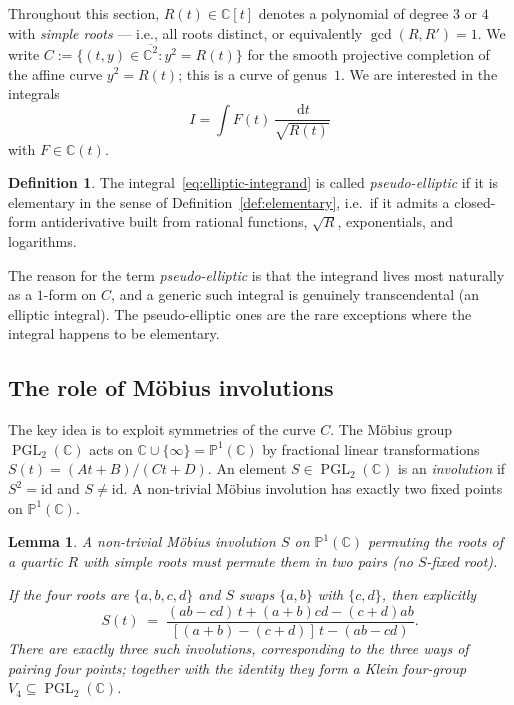 \documentclass[11pt,a4paper]{article}
\theoremstyle{plain}
\newtheorem{lemma}[theorem]{Lemma}
\theoremstyle{definition}
\newtheorem{definition}[theorem]{Definition}
\theoremstyle{remark}
\newcommand{\C}{\mathbb{C}}
\newcommand{\PGL}{\operatorname{PGL}}
\renewcommand{\d}{\,\mathrm{d}}
\begin{document}
Throughout this section, $R(t)\in\C[t]$ denotes a polynomial of degree $3$ or $4$ with \emph{simple roots} — i.e., all roots distinct, or equivalently $\gcd(R,R') = 1$. We write $C := \{(t,y)\in\overline{\C^2} : y^2 = R(t)\}$ for the smooth projective completion of the affine curve $y^2=R(t)$; this is a curve of genus~$1$. We are interested in the integrals
\begin{equation}\label{eq:elliptic-integrand}
  I = \int F(t)\,\frac{\d t}{\sqrt{R(t)}}
\end{equation}
with $F\in\C(t)$.

\begin{definition}\label{def:pseudo-elliptic}
The integral~\eqref{eq:elliptic-integrand} is called \emph{pseudo-elliptic} if it is elementary in the sense of Definition~\ref{def:elementary}, i.e.\ if it admits a closed-form antiderivative built from rational functions, $\sqrt{R}$, exponentials, and logarithms.
\end{definition}

The reason for the term \emph{pseudo-elliptic} is that the integrand lives most naturally as a $1$-form on $C$, and a generic such integral is genuinely transcendental (an elliptic integral). The pseudo-elliptic ones are the rare exceptions where the integral happens to be elementary.

\subsection{The role of M\"obius involutions}

The key idea is to exploit symmetries of the curve $C$. The M\"obius group $\PGL_2(\C)$ acts on $\C\cup\{\infty\}=\mathbb{P}^1(\C)$ by fractional linear transformations $S(t) = (At+B)/(Ct+D)$. An element $S \in \PGL_2(\C)$ is an \emph{involution} if $S^2 = \mathrm{id}$ and $S\neq \mathrm{id}$. A non-trivial M\"obius involution has exactly two fixed points on $\mathbb{P}^1(\C)$.

\begin{lemma}\label{lem:involutions-pairs}
A non-trivial M\"obius involution $S$ on $\mathbb{P}^1(\C)$ permuting the roots of a quartic $R$ with simple roots must permute them in two pairs (no $S$-fixed root).

If the four roots are $\{a,b,c,d\}$ and $S$ swaps $\{a,b\}$ with $\{c,d\}$, then explicitly
\begin{equation}\label{eq:involution-formula}
  S(t) \;=\; \frac{(ab-cd)\,t + (a+b)cd - (c+d)ab}{[(a+b)-(c+d)]\,t - (ab-cd)}.
\end{equation}
There are exactly three such involutions, corresponding to the three ways of pairing four points; together with the identity they form a Klein four-group $V_4 \subseteq \PGL_2(\C)$.
\end{lemma}
\end{document}
